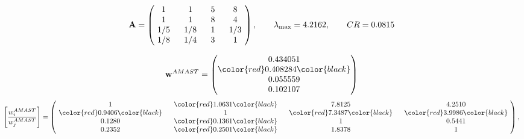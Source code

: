 \begin{example}
\begin{equation*}
\mathbf{A} =
\begin{pmatrix}
$\,\,$ 1 $\,\,$ & $\,\,$1$\,\,$ & $\,\,$5$\,\,$ & $\,\,$8 $\,\,$ \\
$\,\,$ 1 $\,\,$ & $\,\,$ 1 $\,\,$ & $\,\,$8$\,\,$ & $\,\,$4 $\,\,$ \\
$\,\,$ 1/5$\,\,$ & $\,\,$ 1/8$\,\,$ & $\,\,$ 1 $\,\,$ & $\,\,$ 1/3 $\,\,$ \\
$\,\,$ 1/8$\,\,$ & $\,\,$ 1/4$\,\,$ & $\,\,$3$\,\,$ & $\,\,$ 1  $\,\,$ \\
\end{pmatrix},
\qquad
\lambda_{\max} =
4.2162,
\qquad
CR = 0.0815
\end{equation*}

\begin{equation*}
\mathbf{w}^{AMAST} =
\begin{pmatrix}
0.434051\\
\color{red} 0.408284\color{black} \\
0.055559\\
0.102107
\end{pmatrix}\end{equation*}
\begin{equation*}
\left[ \frac{{w}^{AMAST}_i}{{w}^{AMAST}_j} \right] =
\begin{pmatrix}
$\,\,$ 1 $\,\,$ & $\,\,$\color{red} 1.0631\color{black} $\,\,$ & $\,\,$7.8125$\,\,$ & $\,\,$4.2510$\,\,$ \\
$\,\,$\color{red} 0.9406\color{black} $\,\,$ & $\,\,$ 1 $\,\,$ & $\,\,$\color{red} 7.3487\color{black} $\,\,$ & $\,\,$\color{red} 3.9986\color{black}   $\,\,$ \\
$\,\,$0.1280$\,\,$ & $\,\,$\color{red} 0.1361\color{black} $\,\,$ & $\,\,$ 1 $\,\,$ & $\,\,$0.5441 $\,\,$ \\
$\,\,$0.2352$\,\,$ & $\,\,$\color{red} 0.2501\color{black} $\,\,$ & $\,\,$1.8378$\,\,$ & $\,\,$ 1  $\,\,$ \\
\end{pmatrix},
\end{equation*}


\end{example}
